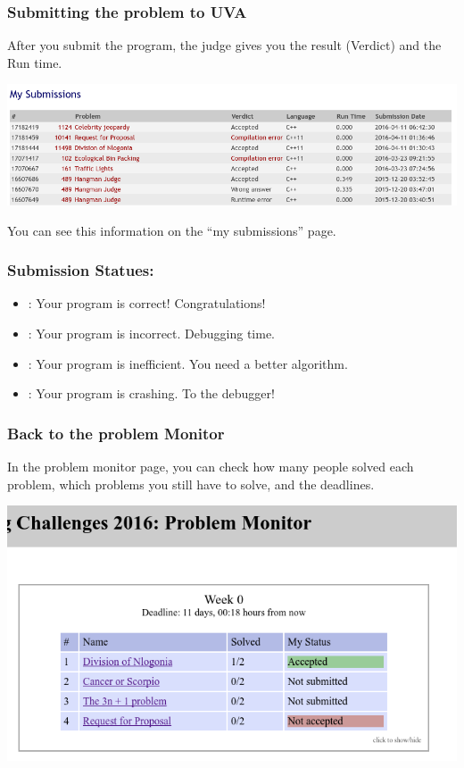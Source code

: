 \documentclass{beamer}
\begin{document}
\begin{frame}
  \frametitle{Submitting the problem to UVA}

  {\small

    After you submit the program, the judge gives you the result
    (Verdict) and the Run time.
    
    \begin{center}
      \includegraphics[width=.8\textwidth]{../img/submissionpage}
    \end{center}

    You can see this information on the ``my submissions'' page.
  }
\end{frame}

\begin{frame}
  \frametitle{Submission Statues:}
  \begin{itemize}
  \item {}: Your program is correct!
    Congratulations!

    \bigskip
    
  \item {}: Your program is incorrect. Debugging
    time.

    \bigskip

  \item {}: Your program is
    inefficient. You need a better algorithm.

    \bigskip
  \item {}: Your program is crashing. To the
    debugger!

    \bigskip
  \end{itemize}

\end{frame}

\begin{frame}
  \frametitle{Back to the problem Monitor}

  In the problem monitor page, you can check how many people solved
  each problem, which problems you still have to solve, and the
  deadlines.

  \begin{center}
    \includegraphics[width=.7\textwidth]{../img/monitorpage2}
  \end{center}
\end{frame}
\end{document}
